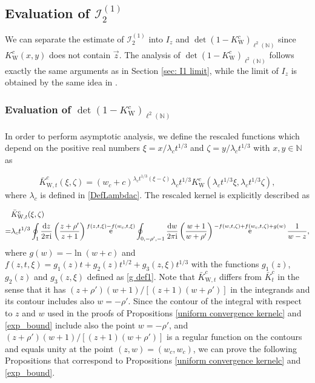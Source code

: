 \documentclass[cmp]{svjour}
\numberwithin{theorem}{section}
\numberwithin{equation}{section}
\DeclareMathOperator{\e}{e}
\def\dd{{\rm d}}
\def\ii{{\rm i}}
\begin{document}
\subsection{Evaluation of $\mathcal{I}^{(1)}_2$}
\label{subsec:Ev_I21}
We can separate the estimate of $\mathcal{I}^{(1)}_2$ into $I_z$ and ${\det\left( 1 - K^c_{\mathrm{W}} \right)}_{\ell^2(\mathbb{N})}$ since $K^c_{\mathrm{W}}(x,y)$ does not contain $\vec{z}$. The analysis of ${\det\left( 1 - K^c_{\mathrm{W}} \right)}_{\ell^2(\mathbb{N})}$ follows exactly the same arguments as in Section \ref{sec: I1 limit}, while the limit of $I_z$ is obtained by the same idea in \cite{borodin2008transition,borodin2007fluctuationsintasep,BFPS2007}.

\subsubsection{Evaluation of ${\det\left( 1 - K^c_{\mathrm{W}} \right)}_{\ell^2(\mathbb{N})}$}


In order to perform asymptotic analysis, we define the rescaled functions which depend on the positive real numbers $\xi = x/ \lambda_c t^{1/3}$ and $\zeta = y/ \lambda_c t^{1/3}$ with $x, y \in \mathbb{N}$ as

\begin{equation}\label{def:Kcresc}
\bar{K}^c_{\mathrm{W},t}(\xi,\zeta) = {(w_c + c)}^{ \lambda_c t^{1/3} (\xi - \zeta) } \lambda_c t^{1/3} K^c_{\mathrm{W}}(\lambda_c t^{1/3} \xi , \lambda_c t^{1/3} \zeta),
\end{equation}
where $\lambda_c$ is defined in \eqref{DefLambdac}.
The rescaled kernel is explicitly described as

\begin{equation*}
\label{RescKernelc2}
\begin{split}
& \bar{K}_{\mathrm{W},t}^c(\xi, \zeta) \\
=& \lambda_c t^{1/3} \oint_1 \frac{\dd z}{2 \pi \ii} \left( \frac{z + \rho'}{z + 1} \right) \e^{ f(z, t, \xi) - f(w_c , t,\xi) } \oint_{0,-\rho',-1} \frac{\dd w}{2 \pi \ii} \left( \frac{w + 1}{w + \rho'} \right) \e^{-f(w,t,\zeta) + f(w_c , t,\zeta) + g(w)}  \frac{1}{w - z},
\end{split}
\end{equation*}
where $g(w) = -\ln{(w+c)}$ and $f(z,t,\xi) = g_1(z) t + g_2(z) t^{1/2} + g_3(z,\xi) t^{1/3}$ with the functions $g_1(z)$, $g_2(z)$ and $g_3(z,\xi)$ defined as \eqref{g def1}.
Note that $\bar{K}_{\mathrm{W},t}^c$ differs from $\bar{K}^c_t$ in the sense that it has $(z + \rho')(w + 1)/[(z + 1)(w + \rho')]$ in the integrands and its contour includes also $w=-\rho'$.
Since the contour of the integral with respect to $z$ and $w$ used in the proofs of Propositions \ref{uniform convergence kernelc} and \ref{exp_bound} include also the point $w = -\rho'$, and $(z + \rho')(w + 1)/[(z + 1)(w + \rho')]$ is a regular function on the contours and equals unity at the point $(z, w) = (w_c, w_c)$, we can prove the following Propositions that correspond to Propositions \ref{uniform convergence kernelc} and \ref{exp_bound}.
\end{document}
